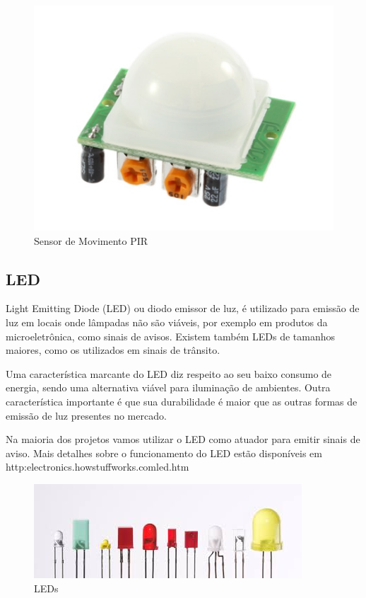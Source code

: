 \begin{figure}[ht]
      \centering
      \includegraphics[scale=1.20]{figuras/Fpir.png}
      \caption{Sensor de Movimento PIR}
      \label{fig:SPIR}
\end{figure}



\subsection{LED}

Light Emitting Diode (LED) ou diodo emissor de luz, é utilizado para emissão de luz em locais onde lâmpadas não são viáveis, por exemplo em produtos da microeletrônica, como sinais de avisos. Existem também LEDs de tamanhos maiores, como os utilizados em sinais de trânsito.

Uma característica marcante do LED diz respeito ao seu baixo consumo de energia, sendo uma alternativa viável para iluminação de ambientes. Outra característica importante é que sua durabilidade é maior que as outras formas de emissão de luz presentes no mercado.

Na maioria dos projetos vamos utilizar o LED como atuador para emitir sinais de aviso. Mais detalhes sobre o funcionamento do LED estão disponíveis em http:\/\/electronics.howstuffworks.com\/led.htm


\begin{figure}[ht]
      \centering
      \includegraphics[scale=0.50]{figuras/Fled.jpg}
      \caption{LEDs}
      \label{fig:Aled}
\end{figure}



